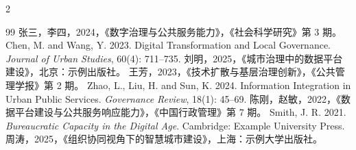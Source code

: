 \documentclass[aspectratio=169,10pt]{beamer}
\begin{document}
\begin{frame}
\end{frame}

\begin{frame}
  \begin{columns}[T,onlytextwidth]
  \end{columns}
\end{frame}

\begin{frame}[allowframebreaks]
  \begin{multicols}{2}
  \begin{thebibliography}{99}
    \footnotesize
     张三，李四，2024，《数字治理与公共服务能力》，《社会科学研究》第 3 期。
     Chen, M. and Wang, Y. 2023. Digital Transformation and Local Governance. \textit{Journal of Urban Studies}, 60(4): 711--735.
     刘明，2025，《城市治理中的数据平台建设》，北京：示例出版社。
     王芳，2023，《技术扩散与基层治理创新》，《公共管理学报》第 2 期。
     Zhao, L., Liu, H. and Sun, K. 2024. Information Integration in Urban Public Services. \textit{Governance Review}, 18(1): 45--69.
     陈刚，赵敏，2022，《数据平台建设与公共服务响应能力》，《中国行政管理》第 7 期。
     Smith, J. R. 2021. \textit{Bureaucratic Capacity in the Digital Age}. Cambridge: Example University Press.
     周涛，2025，《组织协同视角下的智慧城市建设》，上海：示例大学出版社。
  \end{thebibliography}
  \end{multicols}
\end{frame}

\end{document}
